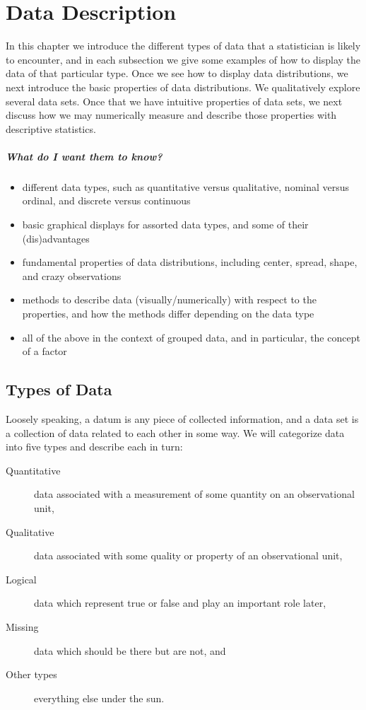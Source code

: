 \documentclass[captions=tableheading]{scrbook}
\begin{document}
\setcounter{thm}{0}
\chapter{Data Description}
\label{sec-2}

\label{cha:Describing-Data-Distributions}

\noindent In this chapter we introduce the different types of data that a statistician is likely to encounter, and in each subsection we give some examples of how to display the data of that particular type. Once we see how to display data distributions, we next introduce the basic properties of data distributions. We qualitatively explore several data sets. Once that we have intuitive properties of data sets, we next discuss how we may numerically measure and describe those properties with descriptive statistics.

\paragraph*{What do I want them to know?}

\begin{itemize}
\item different data types, such as quantitative versus qualitative, nominal versus ordinal, and discrete versus continuous
\item basic graphical displays for assorted data types, and some of their (dis)advantages
\item fundamental properties of data distributions, including center, spread, shape, and crazy observations
\item methods to describe data (visually/numerically) with respect to the properties, and how the methods differ depending on the data type
\item all of the above in the context of grouped data, and in particular, the concept of a factor
\end{itemize}
\section{Types of Data}
\label{sec-2-1}

\label{sec:Types-of-Data}

Loosely speaking, a datum is any piece of collected information, and a data set is a collection of data related to each other in some way. We will categorize data into five types and describe each in turn:

\begin{description}
\item[Quantitative] data associated with a measurement of some quantity on an observational unit,
\item[Qualitative] data associated with some quality or property of an observational unit,
\item[Logical] data which represent true or false and play an important role later,
\item[Missing] data which should be there but are not, and
\item[Other types] everything else under the sun.
\end{description}
\end{document}
